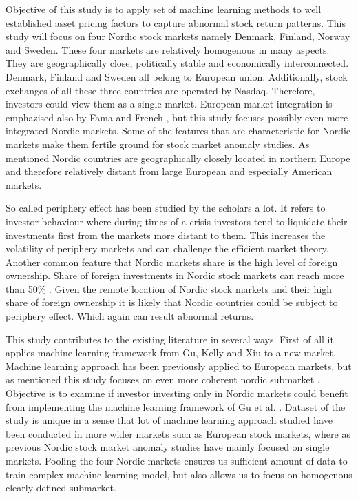 \documentclass{article}
\begin{document}
Objective of this study is to apply set of machine learning methods to well established asset pricing factors to capture abnormal stock return patterns. This study will focus on four Nordic stock markets namely Denmark, Finland, Norway and Sweden. These four markets are relatively homogenous in many aspects. They are geographically close, politically stable and economically interconnected. Denmark, Finland and Sweden all belong to European union. Additionally, stock exchanges of all these three countries are operated by Nasdaq. Therefore, investors could view them as a single market. European market integration is emphazised also by Fama and French \citeyear{FAMA2012457}, but this study focuses possibly even more integrated Nordic markets. Some of the features that are characteristic for Nordic markets make them fertile ground for stock market anomaly studies. As mentioned Nordic countries are geographically closely located in northern Europe and therefore relatively distant from large European and especially American markets.  \par

So called periphery effect has been studied by the scholars a lot. %
It refers to investor behaviour where during times of a crisis investors tend to liquidate their investments first from the markets more distant to them. This increases the volatility of periphery markets and can challenge the efficient market theory. Another common feature that Nordic markets share is the high level of foreign ownership. Share of foreign investments in Nordic stock markets can reach more than 50\% \footnotemark. Given the remote location of Nordic stock markets and their high share of foreign ownership it is likely that Nordic countries could be subject to periphery effect. Which again can result abnormal returns. \par


This study contributes to the existing literature in several ways. First of all it applies machine learning framework from Gu, Kelly and Xiu \citeyear{guetal} to a new market. Machine learning approach has been previously applied to European markets, but as mentioned this study focuses on even more coherent nordic submarket \cite{Drobetz, Fieberg}. Objective is to examine if investor investing only in Nordic markets could benefit from implementing the machine learning framework of Gu et al. \citeyear{guetal}. Dataset of the study is unique in a sense that lot of machine learning approach studied have been conducted in more wider markets such as European stock markets, where as previous Nordic stock market anomaly studies have mainly focused on single markets. Pooling the four Nordic markets ensures us sufficient amount of data to train complex machine learning model, but also allows us to focus on homogenous clearly defined submarket. \par
\end{document}
